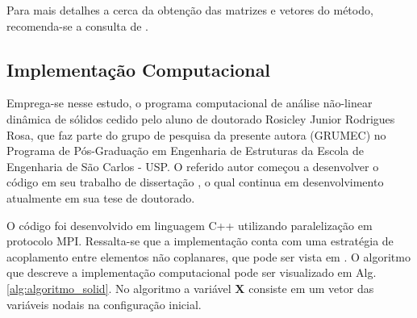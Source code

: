 \documentclass[tese_patricia]{subfiles}
\begin{document}
Para mais detalhes a cerca da obtenção das matrizes e vetores do método, recomenda-se a consulta de .

\subsection{Implementação Computacional}

Emprega-se nesse estudo, o programa computacional de análise não-linear dinâmica de sólidos cedido pelo aluno de doutorado Rosicley Junior Rodrigues Rosa, que faz parte do grupo de pesquisa da presente autora (GRUMEC) no Programa de Pós-Graduação em Engenharia de Estruturas da Escola de Engenharia de São Carlos - USP. O referido autor começou a desenvolver o código em seu trabalho de dissertação \cite{Rosa:2021}, o qual continua em desenvolvimento atualmente em sua tese de doutorado.

O código foi desenvolvido em linguagem C++ utilizando paralelização em protocolo MPI. Ressalta-se que a implementação conta com uma estratégia de acoplamento entre elementos não coplanares, que pode ser vista em . O algoritmo que descreve a implementação computacional pode ser visualizado em Alg. \ref{alg:algoritmo_solid}. No algoritmo a variável $\mathbf{X}$ consiste em um vetor das variáveis nodais na configuração inicial.
\end{document}

